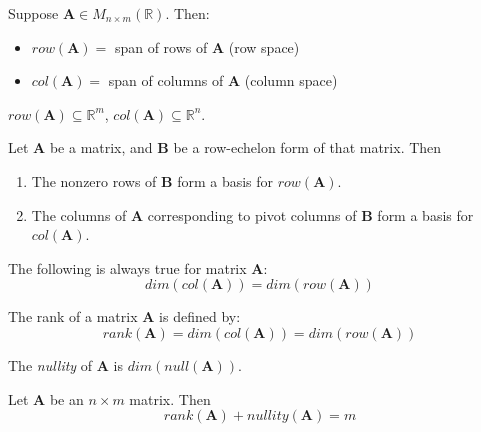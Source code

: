 \begin{definition}
Suppose $\bm{A}\in M_{n\times m}(\mathbb{R})$. Then:
\begin{itemize}
    \item $row(\bm{A})=$ span of rows of $\bm{A}$ (row space)
    \item $col(\bm{A})=$ span of columns of $\bm{A}$ (column space)
\end{itemize}
$row(\bm{A})\subseteq\mathbb{R}^m$, $col(\bm{A})\subseteq\mathbb{R}^n$.
\end{definition}

\begin{theorem}
Let $\bm{A}$ be a matrix, and $\bm{B}$ be a row-echelon form of that matrix. Then
\begin{enumerate}[label=\alph*)]
    \item The nonzero rows of $\bm{B}$ form a basis for $row(\bm{A})$.
    \item The columns of $\bm{A}$ corresponding to pivot columns of $\bm{B}$ form a basis for $col(\bm{A})$.
\end{enumerate}
\end{theorem}

\begin{theorem}
The following is always true for matrix $\bm{A}$:
\begin{equation}
    dim(col(\bm{A})) = dim(row(\bm{A}))
\end{equation}
\end{theorem}

\begin{definition}[Rank]
The rank of a matrix $\bm{A}$ is defined by:
\begin{equation}
    rank(\bm{A}) = dim(col(\bm{A})) = dim(row(\bm{A}))
\end{equation}
\end{definition}

\begin{definition}[Nullity]
The \emph{nullity} of $\bm{A}$ is $dim(null(\bm{A}))$.
\end{definition}

\begin{theorem}
Let $\bm{A}$ be an $n\times m$ matrix. Then
\begin{equation}
    rank(\bm{A}) + nullity(\bm{A})=m
\end{equation}
\end{theorem}
